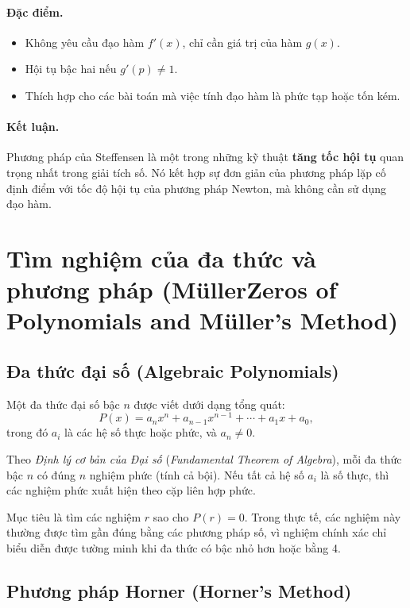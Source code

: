 \paragraph*{Đặc điểm.}
\begin{itemize}
    \item Không yêu cầu đạo hàm $f'(x)$, chỉ cần giá trị của hàm $g(x)$.
    \item Hội tụ bậc hai nếu $g'(p) \ne 1$.
    \item Thích hợp cho các bài toán mà việc tính đạo hàm là phức tạp hoặc tốn kém.
\end{itemize}

\paragraph*{Kết luận.}
Phương pháp của Steffensen là một trong những kỹ thuật 
\textbf{tăng tốc hội tụ} quan trọng nhất trong giải tích số.
Nó kết hợp sự đơn giản của phương pháp lặp cố định điểm với tốc độ hội tụ của phương pháp Newton, mà không cần sử dụng đạo hàm.
\section{Tìm nghiệm của đa thức và phương pháp 
(MüllerZeros of Polynomials and Müller's Method)}

\subsection{Đa thức đại số (Algebraic Polynomials)}

Một đa thức đại số bậc $n$ được viết dưới dạng tổng quát:
\[
P(x) = a_nx^n + a_{n-1}x^{n-1} + \cdots + a_1x + a_0,
\]
trong đó $a_i$ là các hệ số thực hoặc phức, và $a_n \neq 0$.

Theo \textit{Định lý cơ bản của Đại số} (\textit{Fundamental Theorem of Algebra}), mỗi đa thức bậc $n$ có đúng $n$ nghiệm phức (tính cả bội).  
Nếu tất cả hệ số $a_i$ là số thực, thì các nghiệm phức xuất hiện theo cặp liên hợp phức.

Mục tiêu là tìm các nghiệm $r$ sao cho $P(r) = 0$. Trong thực tế, các nghiệm này thường được tìm gần đúng bằng các phương pháp số, vì nghiệm chính xác chỉ biểu diễn được tường minh khi đa thức có bậc nhỏ hơn hoặc bằng 4.

\subsection{Phương pháp Horner (Horner’s Method)}

